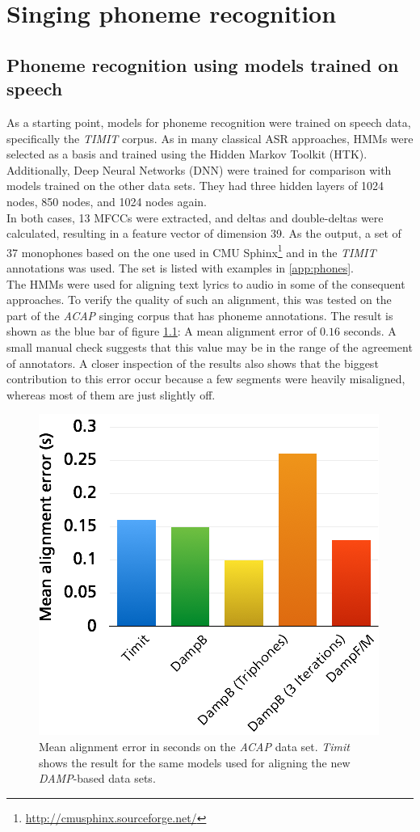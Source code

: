 \chapter{Singing phoneme recognition} \label{chap:phonerec}
\section{Phoneme recognition using models trained on speech}
As a starting point, models for phoneme recognition were trained on speech data, specifically the \textit{TIMIT} corpus. As in many classical ASR approaches, HMMs were selected as a basis and trained using the Hidden Markov Toolkit (HTK)\cite{htk}.\\
Additionally, Deep Neural Networks (DNN) were trained for comparison with models trained on the other data sets. They had three hidden layers of 1024 nodes, 850 nodes, and 1024 nodes again.\\
In both cases, 13 MFCCs were extracted, and deltas and double-deltas were calculated, resulting in a feature vector of dimension 39. As the output, a set of 37 monophones based on the one used in CMU Sphinx\footnote{\url{http://cmusphinx.sourceforge.net/}} and in the \textit{TIMIT} annotations was used. The set is listed with examples in \ref{app:phones}.\\
The HMMs were used for aligning text lyrics to audio in some of the consequent approaches. To verify the quality of such an alignment, this was tested on the part of the \textit{ACAP} singing corpus that has phoneme annotations. The result is shown as the blue bar of figure \ref{fig:res_alignment}: A mean alignment error of $0.16$ seconds. A small manual check suggests that this value may be in the range of the agreement of annotators. A closer inspection of the results also shows that the biggest contribution to this error occur because a few segments were heavily misaligned, whereas most of them are just slightly off.\\
\begin{figure}
	\begin{center}
		\includegraphics[width=.4\textwidth]{images/res_alignment.png}
		\caption{Mean alignment error in seconds on the \textit{ACAP} data set. \textit{Timit} shows the result for the same models used for aligning the new \textit{DAMP}-based data sets.}
		\label{fig:res_alignment}
	\end{center}
\end{figure}
